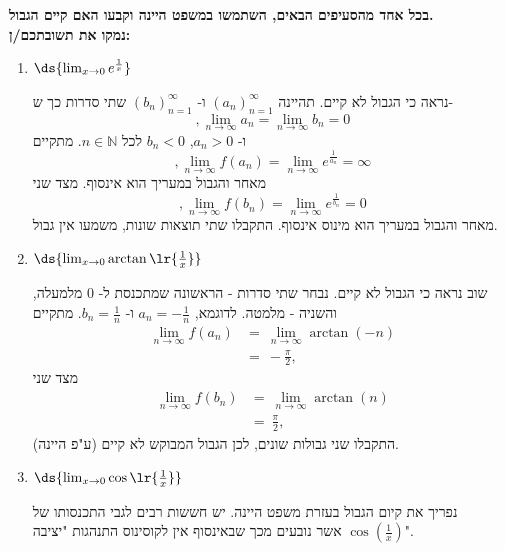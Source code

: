 \textbf{
בכל אחד מהסעיפים הבאים, השתמשו במשפט היינה וקבעו האם קיים הגבול. \\
נמקו את תשובתכם/ן:}

\begin{enumerate}

\item $\ds{\lim_{x \to 0} e^{\frac{1}{x}}}$
\ifsol
{}
\begin{solbox}
נראה כי הגבול לא קיים.
תהיינה
$(a_n)_{n=1}^\infty$
ו-
$(b_n)_{n=1}^\infty$
שתי סדרות כך ש-
$$,\lim_{n\to\infty}a_n=\lim_{n\to\infty}b_n=0$$
ו-
$a_n>0$, $b_n<0$
לכל
$n\in\mathbb{N}$.
מתקיים
$$,\displaystyle\lim_{n\to\infty}f(a_n)=\lim_{n\to\infty}e^{\frac{1}{a_n}}
=\infty$$
מאחר והגבול במעריך הוא אינסוף.
מצד שני
$$,\displaystyle\lim_{n\to\infty}f(b_n)=\lim_{n\to\infty}e^{\frac{1}{b_n}}=0$$
מאחר והגבול במעריך הוא מינוס אינסוף.
התקבלו שתי תוצאות שונות, משמעו אין גבול.
\end{solbox}
\fi

\item $\ds{\lim_{x \to 0} \arctan\lr{ \frac{1}{x} } }$
\ifsol
{}
\begin{solbox}
שוב נראה כי הגבול לא קיים. נבחר שתי סדרות - הראשונה שמתכנסת ל-
$0$
מלמעלה, והשניה - מלמטה.
לדוגמא,
$a_n=-\tfrac{1}{n}$
ו-
$b_n=\tfrac{1}{n}$.
מתקיים
\begin{align*}
\displaystyle\lim_{n\to\infty}f(a_n)
&=\ \displaystyle\lim_{n\to\infty}\arctan(-n)\\
&=\ -\frac{\pi}{2},
\end{align*}
מצד שני
\begin{align*}
\displaystyle\lim_{n\to\infty}f(b_n)
&=\ \displaystyle\lim_{n\to\infty}\arctan(n)\\
&=\ \frac{\pi}{2},
\end{align*}
התקבלו שני גבולות שונים, לכן הגבול המבוקש לא קיים
(ע"פ היינה).
\end{solbox}
\fi

\item $\ds{\lim_{x \to 0} \cos\lr{\frac{1}{x} }}$
\ifsol
{}
\begin{solbox}
נפריך את קיום הגבול בעזרת משפט היינה.
יש חששות רבים לגבי התכנסותו
של
$\cos\left(\frac{1}{x}\right)$
אשר נובעים מכך שבאינסוף אין לקוסינוס התנהגות "יציבה".


\end{solbox}
\end{enumerate}
